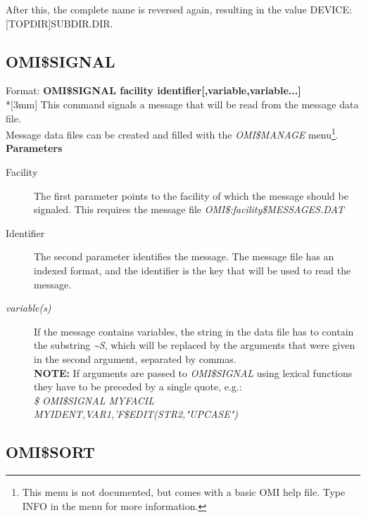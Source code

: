 \documentclass[a4paper]{book}
\renewcommand{\indent}{\hspace*{5mm}}
\begin{document}
After this, the complete name is reversed again, resulting in the value 
\linebreak DEVICE:[TOPDIR]SUBDIR.DIR.


\subsection{OMI{\$}SIGNAL}
\label{subsubsec:mylabel61}

\indent Format: \textbf{OMI{\$}SIGNAL \textsf{facility identifier[,variable,variable...]}}\\*[3mm]
This command signals a message that will be read from the message data file. \\
Message data files can be created and filled with the \textsl{OMI{\$}MANAGE} menu\footnote{ This menu is not documented, but comes with a basic OMI help file. Type \textsf{INFO} in the menu for more information.}.\\[3mm]
\textbf{Parameters}

\begin{description}
\item[Facility]
The first parameter points to the facility of which the message should be 
signaled. This requires the message file 
\textsl{OMI{\$}:\textit{facility}{\$}MESSAGES.DAT}

\item[Identifier]
The second parameter identifies the message. The message file has an indexed 
format, and the identifier is the key that will be used to read the message.

\item[\textit{variable(s)}]
If the message contains variables, the string in the data file has to 
contain the substring \textsl{\~{}S}, which will be replaced by the arguments that were 
given in the second argument, separated by commas.\\
\hspace{-3mm}\textbf{NOTE:} If arguments are passed to \textsl{OMI{\$}SIGNAL} using lexical 
functions they have to be preceded by a single quote, e.g.: \\
\textsl{{\$} OMI{\$}SIGNAL MYFACIL MYIDENT,VAR1,'F{\$}EDIT(STR2,"UPCASE")}
\end{description}

\subsection{OMI{\$}SORT}
\label{subsubsec:omisort}
\end{document}
